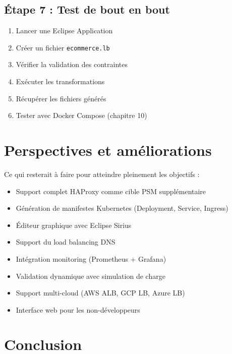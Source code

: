 \documentclass[12pt,a4paper]{report}
\begin{document}
\section{Étape 7 : Test de bout en bout}

\begin{enumerate}
  \item Lancer une Eclipse Application
  \item Créer un fichier \texttt{ecommerce.lb}
  \item Vérifier la validation des contraintes
  \item Exécuter les transformations
  \item Récupérer les fichiers générés
  \item Tester avec Docker Compose (chapitre 10)
\end{enumerate}

\chapter{Perspectives et améliorations}

Ce qui resterait à faire pour atteindre pleinement les objectifs :

\begin{itemize}
  \item Support complet HAProxy comme cible PSM supplémentaire
  \item Génération de manifestes Kubernetes (Deployment, Service, Ingress)
  \item Éditeur graphique avec Eclipse Sirius
  \item Support du load balancing DNS
  \item Intégration monitoring (Prometheus + Grafana)
  \item Validation dynamique avec simulation de charge
  \item Support multi-cloud (AWS ALB, GCP LB, Azure LB)
  \item Interface web pour les non-développeurs
\end{itemize}

\chapter*{Conclusion}
\end{document}
